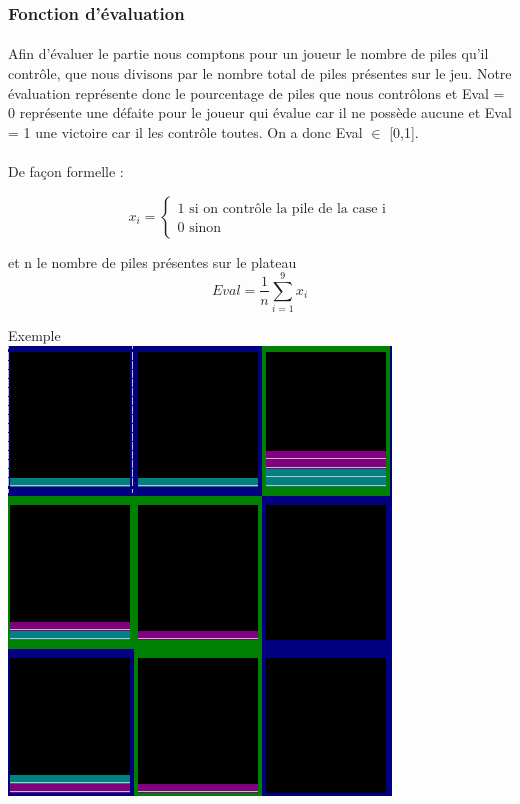\documentclass[article, backcover, french, nodocumentinfo]{upmethodology-document}
\begin{document}
			\subsubsection{Fonction d'évaluation}
				\paragraph{}
					Afin d'évaluer le partie  
					nous comptons pour un joueur  le nombre de piles qu’il contrôle, que nous divisons par le nombre total de piles présentes sur le jeu.
					Notre évaluation représente donc le pourcentage de piles que nous contrôlons et Eval = 0 représente une défaite pour le joueur qui évalue car il ne possède aucune  et Eval = 1 une victoire car il les contrôle toutes. On a donc Eval $\in$ [0,1].
					\\\\De façon formelle :
					
					$$
					x_{i} = \left\{
					\begin{array}{ll}
						1 \mbox{ si  on contrôle la pile de la case i} \\
						0  \mbox{ sinon}
					\end{array}
					\right.
					$$
					
					et n le nombre de piles présentes sur le plateau
			    	$$Eval = \frac{1}{n}  \sum_{i = 1}^{9} x_{i} $$
				    \begin{center}
				    	 Exemple \\
				    \includegraphics{Eval.png}
					\end{center}
\end{document}

